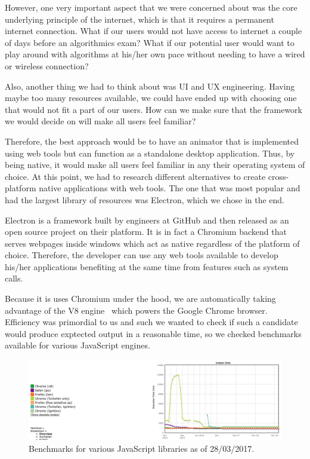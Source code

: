 \documentclass{l4proj}
\begin{document}
However, one very important aspect that we were concerned about was the core underlying principle of the internet, which is that it requires a permanent internet connection. What if our users would not have access to internet a couple of days before an algorithmics exam? What if our potential user would want to play around with algorithms at his/her own pace without needing to have a wired or wireless connection?

Also, another thing we had to think about was UI and UX engineering. Having maybe too many resources available, we could have ended up with choosing one that would not fit a part of our users. How can we make sure that the framework we would decide on will make all users feel familiar?

Therefore, the best approach would be to have an animator that is implemented using web tools but can function as a standalone desktop application. Thus, by being native, it would make all users feel familiar in any their operating system of choice. At this point, we had to research different alternatives to create cross-platform native applications with web tools. The one that was most popular and had the largest library of resources was Electron, which we chose in the end.

Electron is a framework built by engineers at GitHub and then released as an open source project on their platform. It is in fact a Chromium backend that serves webpages inside windows which act as native regardless of the platform of choice. Therefore, the developer can use any web tools available to develop his/her applications benefiting at the same time from features such as system calls.

Because it is uses Chromium under the hood, we are automatically taking advantage of the V8 engine~\cite{v8-chrome} which powers the Google Chrome browser. Efficiency was primordial to us and such we wanted to check if such a candidate would produce exptected output in a reasonable time, so we checked benchmarks available for various JavaScript engines.

\begin{figure}[!ht]
    \centering
    \includegraphics[scale=0.35]{v8-benchmark}
    \caption{Benchmarks for various JavaScript libraries as of 28/03/2017.}
    \label{fig:v8-benchmark}
\end{figure}
\end{document}
